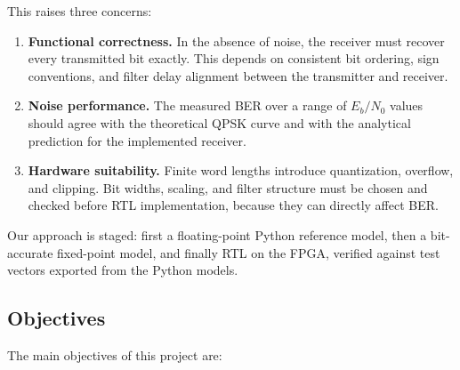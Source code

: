 \documentclass[10pt,twocolumn,letterpaper]{article}
\begin{document}


This raises three concerns:

\begin{enumerate}
    \item \textbf{Functional correctness.}
    In the absence of noise, the receiver must recover every transmitted bit exactly. This depends on consistent bit ordering, sign conventions, and filter delay alignment between the transmitter and receiver.

    \item \textbf{Noise performance.}
    The measured BER over a range of $E_b/N_0$ values should agree with the theoretical QPSK curve and with the analytical prediction for the implemented receiver.

    \item \textbf{Hardware suitability.}
    Finite word lengths introduce quantization, overflow, and clipping. Bit widths, scaling, and filter structure must be chosen and checked before RTL implementation, because they can directly affect BER.
\end{enumerate}

Our approach is staged: first a floating-point Python reference model, then a bit-accurate fixed-point model, and finally RTL on the FPGA, verified against test vectors exported from the Python models.

\subsection{Objectives}

The main objectives of this project are:
\end{document}
